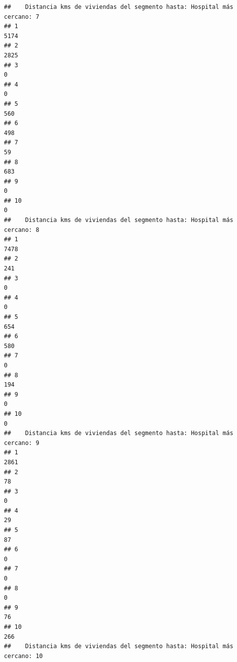 \documentclass[11pt,]{article}
\begin{document}
\begin{verbatim}
##    Distancia kms de viviendas del segmento hasta: Hospital más cercano: 7
## 1                                                                    5174
## 2                                                                    2825
## 3                                                                       0
## 4                                                                       0
## 5                                                                     560
## 6                                                                     498
## 7                                                                      59
## 8                                                                     683
## 9                                                                       0
## 10                                                                      0
##    Distancia kms de viviendas del segmento hasta: Hospital más cercano: 8
## 1                                                                    7478
## 2                                                                     241
## 3                                                                       0
## 4                                                                       0
## 5                                                                     654
## 6                                                                     580
## 7                                                                       0
## 8                                                                     194
## 9                                                                       0
## 10                                                                      0
##    Distancia kms de viviendas del segmento hasta: Hospital más cercano: 9
## 1                                                                    2861
## 2                                                                      78
## 3                                                                       0
## 4                                                                      29
## 5                                                                      87
## 6                                                                       0
## 7                                                                       0
## 8                                                                       0
## 9                                                                      76
## 10                                                                    266
##    Distancia kms de viviendas del segmento hasta: Hospital más cercano: 10

\end{verbatim}
\end{document}
